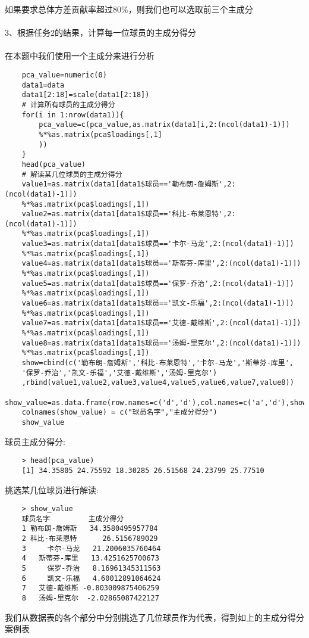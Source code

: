 \documentclass[]{article}
\begin{document}
如果要求总体方差贡献率超过80\%，则我们也可以选取前三个主成分\\\\
3、根据任务2的结果，计算每一位球员的主成分得分\\\\
在本题中我们使用一个主成分来进行分析
\begin{lstlisting}
	pca_value=numeric(0)
	data1=data
	data1[2:18]=scale(data1[2:18])
	# 计算所有球员的主成分得分
	for(i in 1:nrow(data1)){
		pca_value=c(pca_value,as.matrix(data1[i,2:(ncol(data1)-1)])
		%*%as.matrix(pca$loadings[,1]
		))
	}
	head(pca_value)
	# 解读某几位球员的主成分得分
	value1=as.matrix(data1[data1$球员=='勒布朗-詹姆斯',2:(ncol(data1)-1)])
	%*%as.matrix(pca$loadings[,1])
	value2=as.matrix(data1[data1$球员=='科比-布莱恩特',2:(ncol(data1)-1)])
	%*%as.matrix(pca$loadings[,1])
	value3=as.matrix(data1[data1$球员=='卡尔-马龙',2:(ncol(data1)-1)])
	%*%as.matrix(pca$loadings[,1])
	value4=as.matrix(data1[data1$球员=='斯蒂芬-库里',2:(ncol(data1)-1)])
	%*%as.matrix(pca$loadings[,1])
	value5=as.matrix(data1[data1$球员=='保罗-乔治',2:(ncol(data1)-1)])
	%*%as.matrix(pca$loadings[,1])
	value6=as.matrix(data1[data1$球员=='凯文-乐福',2:(ncol(data1)-1)])
	%*%as.matrix(pca$loadings[,1])
	value7=as.matrix(data1[data1$球员=='艾德-戴维斯',2:(ncol(data1)-1)])
	%*%as.matrix(pca$loadings[,1])
	value8=as.matrix(data1[data1$球员=='汤姆-里克尔',2:(ncol(data1)-1)])
	%*%as.matrix(pca$loadings[,1])
	show=cbind(c('勒布朗-詹姆斯','科比-布莱恩特','卡尔-马龙','斯蒂芬-库里',
	'保罗-乔治','凯文-乐福','艾德-戴维斯','汤姆-里克尔')
	,rbind(value1,value2,value3,value4,value5,value6,value7,value8))
	show_value=as.data.frame(row.names=c('d','d'),col.names=c('a','d'),show)
	colnames(show_value) = c("球员名字","主成分得分")
	show_value
\end{lstlisting}
球员主成分得分:
\begin{lstlisting}
	> head(pca_value)
	[1] 34.35805 24.75592 18.30285 26.51568 24.23799 25.77510
\end{lstlisting}
挑选某几位球员进行解读:
\begin{lstlisting}
	> show_value
	球员名字         主成分得分
	1 勒布朗-詹姆斯   34.3580495957784
	2 科比-布莱恩特      26.5156789029
	3     卡尔-马龙   21.2006035760464
	4   斯蒂芬-库里   13.4251625700673
	5     保罗-乔治   8.16961345311563
	6     凯文-乐福   4.60012891064624
	7   艾德-戴维斯 -0.803009875406259
	8   汤姆-里克尔  -2.02865087422127
\end{lstlisting}
我们从数据表的各个部分中分别挑选了几位球员作为代表，得到如上的主成分得分案例表\\\\
\end{document}
